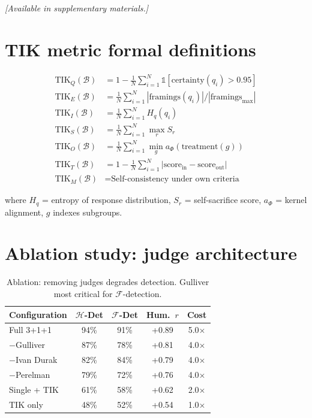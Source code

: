 \documentclass[11pt]{article}
\newcommand{\TIK}{\text{TIK}}
\begin{document}
\textit{[Available in supplementary materials.]}


\section{TIK metric formal definitions}
\label{app:metric-details}

\begin{align}
\TIK_Q(\mathcal{B}) &= 1 - \frac{1}{N}\sum_{i=1}^N \mathbb{1}[\text{certainty}(q_i) > 0.95] \\
\TIK_E(\mathcal{B}) &= \frac{1}{N}\sum_{i=1}^N |\text{framings}(q_i)| / |\text{framings}_{\max}| \\
\TIK_I(\mathcal{B}) &= \frac{1}{N}\sum_{i=1}^N H_q(q_i) \\
\TIK_S(\mathcal{B}) &= \frac{1}{N}\sum_{i=1}^N \max_{r} S_r \\
\TIK_O(\mathcal{B}) &= \frac{1}{N}\sum_{i=1}^N \min_{g} a_\Phi(\text{treatment}(g)) \\
\TIK_T(\mathcal{B}) &= 1 - \frac{1}{N}\sum_{i=1}^N |\text{score}_{\text{in}} - \text{score}_{\text{out}}| \\
\TIK_M(\mathcal{B}) &= \text{Self-consistency under own criteria}
\end{align}

where $H_q$ = entropy of response distribution, $S_r$ = self-sacrifice score, $a_\Phi$ = kernel alignment, $g$ indexes subgroups.


\section{Ablation study: judge architecture}
\label{app:ablation}

\begin{table}[h]
\centering
\small
\caption{Ablation: removing judges degrades detection. Gulliver most critical for $\mathcal{F}$-detection.}
\begin{tabular}{lcccc}
\toprule
\textbf{Configuration} & $\mathcal{H}$\textbf{-Det} & $\mathcal{F}$\textbf{-Det} & \textbf{Hum.}\ $r$ & \textbf{Cost} \\
\midrule
Full 3+1+1 & 94\% & 91\% & +0.89 & 5.0$\times$ \\
$-$Gulliver & 87\% & 78\% & +0.81 & 4.0$\times$ \\
$-$Ivan Durak & 82\% & 84\% & +0.79 & 4.0$\times$ \\
$-$Perelman & 79\% & 72\% & +0.76 & 4.0$\times$ \\
Single + TIK & 61\% & 58\% & +0.62 & 2.0$\times$ \\
TIK only & 48\% & 52\% & +0.54 & 1.0$\times$ \\
\bottomrule
\end{tabular}
\end{table}
\end{document}
